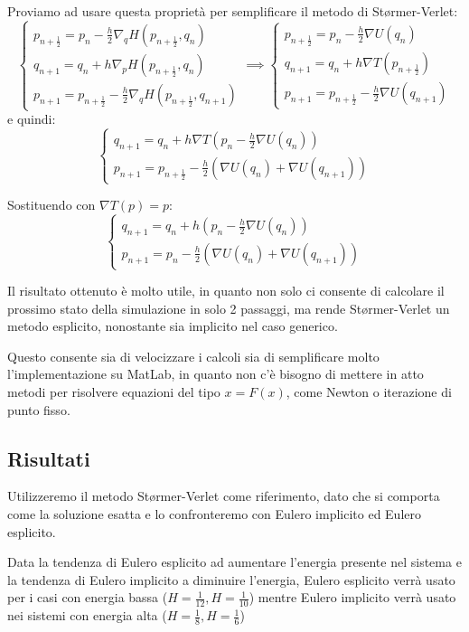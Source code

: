 \documentclass[a4paper, 12pt]{article}
\numberwithin{equation}{section}
\numberwithin{figure}{section}
\begin{document}
Proviamo ad usare questa proprietà per semplificare il metodo di Størmer-Verlet:
$$
\begin{cases}
	p_{n+\frac{1}{2}} = p_n - \frac{h}{2}\nabla_q H(p_{n+\frac{1}{2}},q_n)\\
	q_{n+1} = q_n + h \nabla_p H(p_{n+\frac{1}{2}}, q_n)\\
	p_{n+1} = p_{n+\frac{1}{2}} - \frac{h}{2} \nabla_q H(p_{n+\frac{1}{2}},q_{n+1})
\end{cases}
\implies
\begin{cases}
	p_{n+\frac{1}{2}} = p_n - \frac{h}{2}\nabla U(q_n)\\
	q_{n+1} = q_n + h \nabla T(p_{n+\frac{1}{2}})\\
	p_{n+1} = p_{n+\frac{1}{2}} - \frac{h}{2} \nabla U(q_{n+1})
\end{cases}
$$
e quindi:
$$
\begin{cases}
	q_{n+1} = q_n + h \nabla T(p_n - \frac{h}{2}\nabla U(q_n))\\
	p_{n+1} = p_{n+\frac{1}{2}} - \frac{h}{2} (\nabla U(q_n)+\nabla U(q_{n+1}))
\end{cases}
$$

Sostituendo con $\nabla T(p)=p$:
$$
\begin{cases}
	q_{n+1} = q_n + h(p_n-\frac{h}{2}\nabla U(q_n))\\
	p_{n+1} = p_n - \frac{h}{2} (\nabla U(q_n)+\nabla U(q_{n+1}))
\end{cases}
$$

Il risultato ottenuto è molto utile, in quanto non solo ci consente di calcolare il prossimo
stato della simulazione in solo 2 passaggi, ma rende Størmer-Verlet un metodo esplicito, nonostante
sia implicito nel caso generico.

Questo consente sia di velocizzare i calcoli sia di semplificare molto l'implementazione su MatLab, in
quanto non c'è bisogno di mettere in atto metodi per risolvere equazioni del tipo $x = F(x)$, come
Newton o iterazione di punto fisso.

\subsection{Risultati}
Utilizzeremo il metodo Størmer-Verlet come riferimento, dato che si comporta come la soluzione
esatta \cite{hairer} e lo confronteremo con Eulero implicito ed Eulero esplicito.

Data la tendenza di Eulero esplicito ad aumentare l'energia presente nel sistema e la tendenza
di Eulero implicito a diminuire l'energia, Eulero esplicito verrà usato per i casi con energia
bassa ($H=\frac{1}{12}, H=\frac{1}{10}$) mentre Eulero implicito verrà usato nei sistemi con
energia alta ($H=\frac{1}{8}, H=\frac{1}{6}$)
\end{document}
